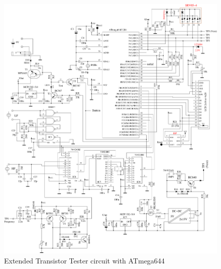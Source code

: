 \begin{figure}[H]
\centering
\includegraphics[width=1.\textwidth]{../FIG/t644tester.pdf}
\caption{Extended Transistor Tester circuit with ATmega644}
\label{fig:t644tester}
\end{figure}


